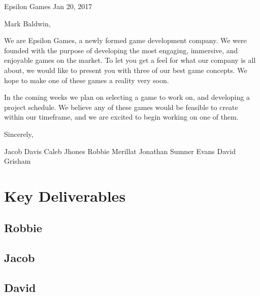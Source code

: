 \documentclass[12pt]{article}
\begin{document}

\hfill Epsilon Games
\hfill Jan 20, 2017

Mark Baldwin,

We are Epsilon Games, a newly formed game development company. We were founded with the purpose of developing the most engaging, immersive, and enjoyable games on the market. To let you get a feel for what our company is all about, we would like to present you with three of our best game concepts. We hope to make one of these games a reality very soon.
 
In the coming weeks we plan on selecting a game to work on, and developing a project schedule. We believe any of these games would be feasible to create within our timeframe, and we are excited to begin working on one of them.

Sincerely,

Jacob Davis
Caleb Jhones
Robbie Merillat
Jonathan Sumner Evans
David Grisham

\newpage
\section {Key Deliverables}

\subsection {Robbie}


\subsection {Jacob}


\subsection {David}
\end{document}
